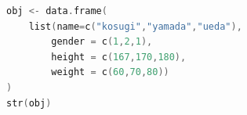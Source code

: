 \begin{lstlisting}[language=c++,label={code:23_01},caption={オブジェクトに代入}]
obj <- data.frame(
    list(name=c("kosugi","yamada","ueda"),
        gender = c(1,2,1),
        height = c(167,170,180),
        weight = c(60,70,80))
)
str(obj)
\end{lstlisting}
